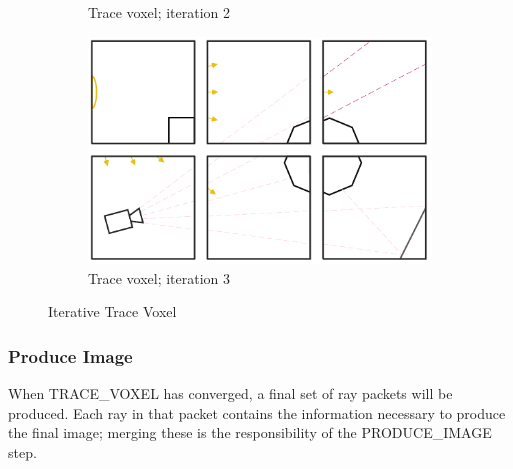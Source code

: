 \begin{figure}[!htb]
\begin{subfigure}{.49\columnwidth}
  \caption{Trace voxel; iteration 2}
\end{subfigure}
\begin{subfigure}{.49\columnwidth}
 \centering
  \includegraphics[width=.98\columnwidth]{drawings/Trace4.pdf}
  \caption{Trace voxel; iteration 3}
\end{subfigure}
\caption{Iterative Trace Voxel}
\label{fig:trace}
\end{figure}

\subsubsection{Produce Image}
When TRACE\_VOXEL has converged, a final set of ray packets will be
produced. Each ray in that packet contains the information necessary
to produce the final image; merging these is the responsibility of the
PRODUCE\_IMAGE step.

